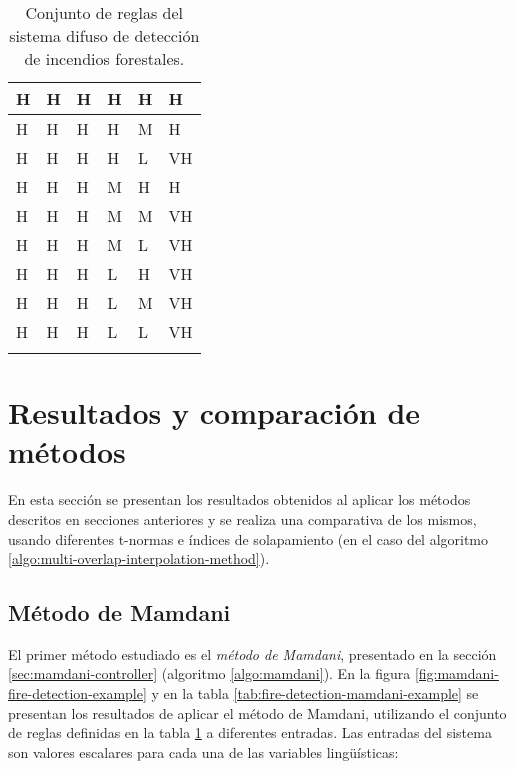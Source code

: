 \begin{center}
\begin{longtable}{| l | l | l | l | l | l |}
    H & H & H & H & H & H \\ \hline 
    H & H & H & H & M & H \\ \hline 
    H & H & H & H & L & VH \\ \hline 
    H & H & H & M & H & H \\ \hline 
    H & H & H & M & M & VH \\ \hline 
    H & H & H & M & L & VH \\ \hline 
    H & H & H & L & H & VH \\ \hline 
    H & H & H & L & M & VH \\ \hline 
    H & H & H & L & L & VH \\
    \hline
    \caption{Conjunto de reglas del sistema difuso de detección de incendios forestales.}
    \label{tab:fire-detection-rule-set}
    \end{longtable}
\end{center}

\section{Resultados y comparación de métodos}
En esta sección se presentan los resultados obtenidos al aplicar los métodos descritos en secciones anteriores y se realiza una comparativa de los mismos, usando diferentes t-normas e índices de solapamiento (en el caso del algoritmo \ref{algo:multi-overlap-interpolation-method}). 

\subsection{Método de Mamdani}
El primer método estudiado es el \emph{método de Mamdani}, presentado en la sección \ref{sec:mamdani-controller} (algoritmo \ref{algo:mamdani}). En la figura \ref{fig:mamdani-fire-detection-example} y en la tabla \ref{tab:fire-detection-mamdani-example} se presentan los resultados de aplicar el método de Mamdani, utilizando el conjunto de reglas definidas en la tabla \ref{tab:fire-detection-rule-set} a diferentes entradas. Las entradas del sistema son valores escalares para cada una de las variables lingüísticas:

